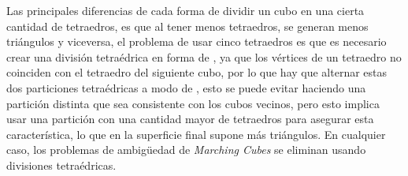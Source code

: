 Las principales diferencias de cada forma de dividir un cubo en una cierta cantidad de tetraedros, es que al tener menos tetraedros, se generan menos triángulos y viceversa, el problema de usar cinco tetraedros es que es necesario crear una división tetraédrica en forma de , ya que los vértices de un tetraedro no coinciden con el tetraedro del siguiente cubo, por lo que hay que alternar estas dos particiones tetraédricas a modo de , esto se puede evitar haciendo una partición distinta que sea consistente con los cubos vecinos, pero esto implica usar una partición con una cantidad mayor de tetraedros para asegurar esta característica, lo que en la superficie final supone más triángulos. En cualquier caso, los problemas de ambigüedad de \emph{Marching Cubes} se eliminan usando divisiones tetraédricas.